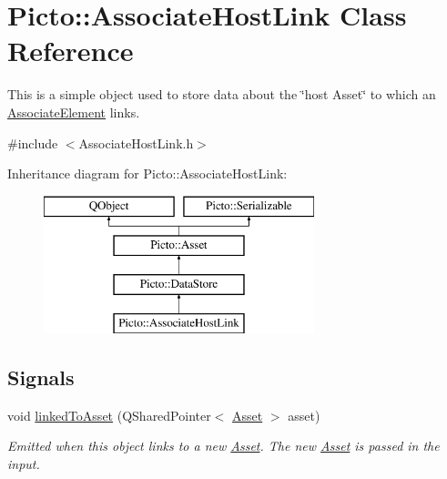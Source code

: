 \hypertarget{class_picto_1_1_associate_host_link}{\section{Picto\-:\-:Associate\-Host\-Link Class Reference}
\label{class_picto_1_1_associate_host_link}
}


This is a simple object used to store data about the \char`\"{}host Asset\char`\"{} to which an \hyperlink{class_picto_1_1_associate_element}{Associate\-Element} links.  




{\ttfamily \#include $<$Associate\-Host\-Link.\-h$>$}

Inheritance diagram for Picto\-:\-:Associate\-Host\-Link\-:\begin{figure}[H]
\begin{center}
\leavevmode
\includegraphics[height=4.000000cm]{class_picto_1_1_associate_host_link}
\end{center}
\end{figure}
\subsection*{Signals}
\begin{DoxyCompactItemize}
\item 
\hypertarget{class_picto_1_1_associate_host_link_a22c3514b038fa329e1fe266a75fc261e}{void \hyperlink{class_picto_1_1_associate_host_link_a22c3514b038fa329e1fe266a75fc261e}{linked\-To\-Asset} (Q\-Shared\-Pointer$<$ \hyperlink{class_picto_1_1_asset}{Asset} $>$ asset)}\label{class_picto_1_1_associate_host_link_a22c3514b038fa329e1fe266a75fc261e}

\begin{DoxyCompactList}\small\item\em Emitted when this object links to a new \hyperlink{class_picto_1_1_asset}{Asset}. The new \hyperlink{class_picto_1_1_asset}{Asset} is passed in the input. \end{DoxyCompactList}\end{DoxyCompactItemize}
